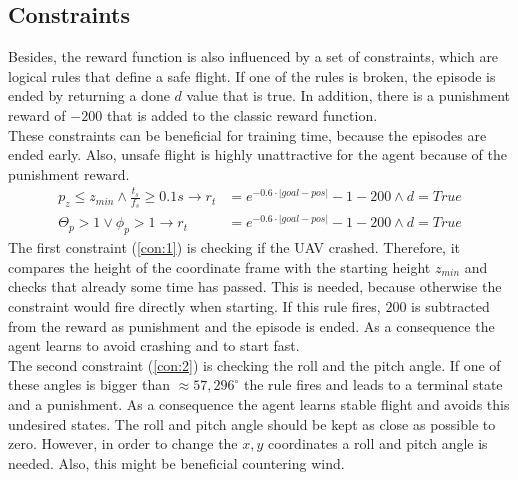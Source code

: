 \subsection{Constraints}
Besides, the reward function is also influenced by a set of constraints, which are logical rules that define a safe flight. 
If one of the rules is broken, the episode is ended by returning a done $d$ value that is true. 
In addition, there is a punishment reward of $-200$ that is added to the classic reward function.\\
These constraints can be beneficial for training time, because the episodes are ended early. 
Also, unsafe flight is highly unattractive for the agent because of the punishment reward. 
\begin{align}
	p_{z} \leq z_{min} \land \frac{t_s}{f_s} \geq 0.1 s \to r_t &= e^{-0.6 \cdot |goal - pos|} - 1 -200 \land d = True \label{con:1}\\
	\Theta_p > 1 \lor \phi_p > 1 \to r_t &= e^{-0.6 \cdot |goal - pos|} - 1 -200 \land d = True \label{con:2}
\end{align}
The first constraint (\cref{con:1}) is checking if the UAV crashed. 
Therefore, it compares the height of the coordinate frame with the starting height $z_{min}$ and checks that already some time has passed. 
This is needed, because otherwise the constraint would fire directly when starting. 
If this rule fires, $200$ is subtracted from the reward as punishment and the episode is ended. 
As a consequence the agent learns to avoid crashing and to start fast.\\
The second constraint (\cref{con:2}) is checking the roll and the pitch angle. 
If one of these angles is bigger than $\approx 57,296^{\circ}$ the rule fires and leads to a terminal state and a punishment. 
As a consequence the agent learns stable flight and avoids this undesired states. The roll and pitch angle should be kept as close as possible to zero. 
However, in order to change the $x,y$ coordinates a roll and pitch angle is needed. Also, this might be beneficial countering wind.

\newpage


